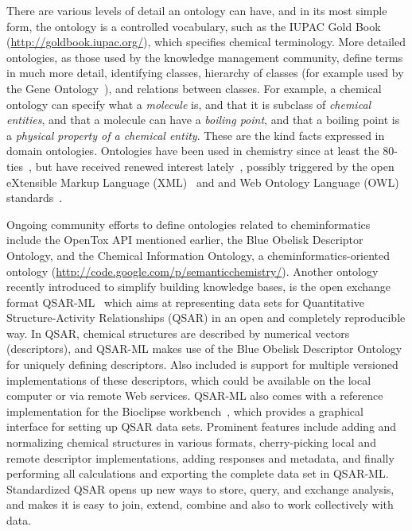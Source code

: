\documentclass[11pt]{book}
\begin{document}
There are various levels of detail an ontology can have, and in its most
simple form, the ontology is a controlled vocabulary, such as the IUPAC
Gold Book (\url{http://goldbook.iupac.org/}), which specifies chemical terminology.
More detailed ontologies, as those used by the knowledge management community,
define terms in much more detail, identifying classes, hierarchy of classes
(for example used by the Gene Ontology~\cite{GO2008,GO2010}), and relations
between classes. For example, a chemical ontology can specify what a \textit{molecule}
is, and that it is subclass of \textit{chemical entities}, and that a molecule can have
a \textit{boiling point}, and that a boiling point is a \textit{physical property of a chemical
entity}. These are the kind facts expressed in domain ontologies.
Ontologies have been used in chemistry since at least the 80-ties~\cite{Gordon1983},
but have received renewed interest lately~\cite{Feldman2005,Dumontier2009,Sankar2010},
possibly triggered by the open eXtensible Markup Language (XML)~\cite{Bray:08:EML}
and and Web Ontology Language (OWL) standards~\cite{Group:09:OWO}.

Ongoing community efforts to define ontologies related to cheminformatics include
the OpenTox API mentioned earlier, the Blue Obelisk Descriptor Ontology, and the
Chemical Information Ontology, a cheminformatics-oriented ontology
(\url{http://code.google.com/p/semanticchemistry/}). Another ontology
recently introduced to simplify building knowledge bases, is
the open exchange format QSAR-ML~\cite{Spjuth:2010fk} which aims at representing data sets
for Quantitative Structure-Activity Relationships (QSAR) in an open and completely
reproducible way. In QSAR, chemical structures are described by numerical vectors
(descriptors), and QSAR-ML makes use of the Blue Obelisk Descriptor Ontology for
uniquely defining descriptors. Also included is support for multiple versioned
implementations of these descriptors, which could be available on the local computer
or via remote Web services. QSAR-ML also comes with a reference implementation for
the Bioclipse workbench~\cite{Spjuth2009,Spjuth2007}, which provides a graphical
interface for setting up QSAR data sets. Prominent features include adding and
normalizing chemical structures in various formats, cherry-picking local and
remote descriptor implementations, adding responses and metadata, and finally
performing all calculations and exporting the complete data set in QSAR-ML.
Standardized QSAR opens up new ways to store, query, and exchange analysis,
and makes it is easy to join, extend, combine and also to work collectively with data.
\end{document}
